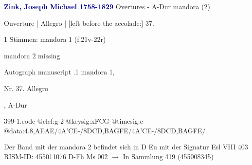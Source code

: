 \documentclass[twocolumn]{book}
\begin{document}
\newline \par \vspace{7pt} \textcolor{darkblue}{\textbf{Zink, Joseph Michael  1758-1829}}
\newline Overtures - A-Dur
\newline mandora (2)
\newline \begin{itshape}[f.21v, at left:] Ouverture | Allegro | [left before the accolade:] 37.\end{itshape} 
\newline \textcolor{darkblue}{}  1 Stimmen: mandora 1  (f.21v-22r)
\newline \begin{small} mandora 2 missing\end{small} 
\newline Autograph manuscript
.1  mandora 1, \begin{itshape}Nr. 37. Allegro\end{itshape}, A-Dur  
\begin{filecontents*}{399-1.code}
@clef:g-2
@keysig:xFCG
@timesig:c
@data:4.8,AEAE/4A'CE-/{8DC}{D,B}{AG}{FE}/4A'CE-/{8DC}{D,B}{AG}{FE}/
\end{filecontents*}
\newline
%
\newline Der Band mit der mandora 2 befindet sich in D Eu mit der Signatur Esl VIII 403
\newline RISM-ID: 455011076
\newline D-Fh  Ms 002
\newline $\rightarrow$ In Sammlung 419 (455008345)
      
\end{document}
